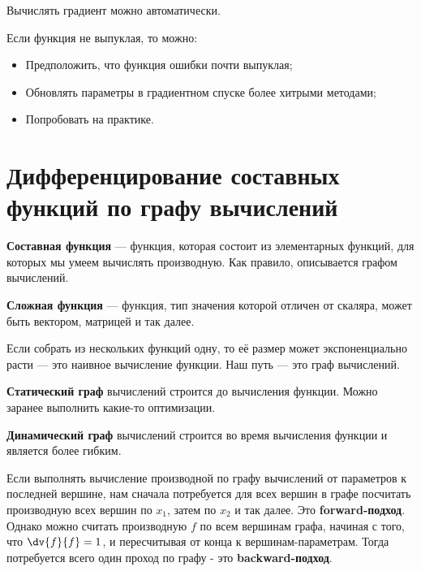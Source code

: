 \begin{remark}
    Вычислять градиент можно автоматически.
\end{remark}

\begin{remark}
    Если функция не выпуклая, то можно:
    \begin{itemize}
        \item Предположить, что функция ошибки почти выпуклая;
        \item Обновлять параметры в градиентном спуске более хитрыми методами;
        \item Попробовать на практике.
    \end{itemize}
\end{remark}

\section{Дифференцирование составных функций по графу вычислений}

\begin{definition}
    \textbf{Составная функция} --- функция, которая состоит из элементарных функций, для которых мы умеем вычислять производную. Как правило, описывается графом вычислений.
\end{definition}

\begin{definition}
    \textbf{Сложная функция} --- функция, тип значения которой отличен от скаляра, может быть вектором, матрицей и так далее.
\end{definition}

Если собрать из нескольких функций одну, то её размер может экспоненциально расти --- это наивное вычисление функции. Наш путь --- это граф вычислений.

\begin{definition}
    \textbf{Статический граф} вычислений строится до вычисления функции. Можно заранее выполнить какие-то оптимизации.
\end{definition}

\begin{definition}
    \textbf{Динамический граф} вычислений строится во время вычисления функции и является более гибким.
\end{definition}

Если выполнять вычисление производной по графу вычислений от параметров к последней вершине, нам сначала потребуется для всех вершин в графе посчитать производную всех вершин по $x_1$, затем по $x_2$ и так далее. Это \textbf{forward-подход}. Однако можно считать производную $f$ по всем вершинам графа, начиная с того, что $\dv{f}{f}=1$, и пересчитывая от конца к вершинам-параметрам. Тогда потребуется всего один проход по графу - это \textbf{backward-подход}.

